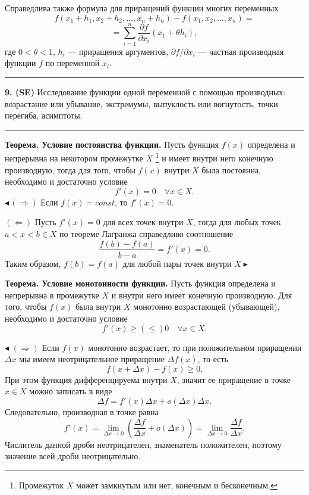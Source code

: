 \documentclass[12pt]{article}
\begin{document}
Справедлива также формула для приращений функции многих переменных
$$
f(x_1 + h_1, x_2 + h_2, ..., x_n + h_n) - f(x_1, x_2, ..., x_n) =
$$
$$
 = \sum_{i = 1}^n\frac{\partial f}{\partial x_i}(x_1 + \theta h_i),
$$
где $0 < \theta < 1$, $h_i$ --- приращения аргументов, $\partial f/ \partial x_i$ --- частная производная функции $f$ по переменной $x_i$.  \\

\noindent\rule{\textwidth}{1pt}
\textbf{9. (SE)} Исследование функции одной переменной с помощью производных: возрастание или убывание, экстремумы, выпуклость или вогнутость, точки перегиба, асимптоты.
	
\noindent\rule{\textwidth}{1pt}

\textbf{Теорема. Условие постоянства функции.} Пусть функция $f(x)$ определена и непрерывна на некотором промежутке $X$ \footnote{Промежуток $X$ может замкнутым или нет, конечным и бесконечным.} и имеет внутри него конечную производную, тогда для того, чтобы $f(x)$ внутри $X$ была постоянна, необходимо и достаточно условие
$$
	f'(x) = 0 \quad \forall x \in X.
$$
$\blacktriangleleft \, (\Rightarrow) $ Если $f(x) = const$, то $f'(x) = 0$.

$(\Leftarrow)$ Пусть $f'(x) = 0$ для всех точек внутри $X$, тогда для любых точек $a < x < b \in X$ по теореме Лагранжа справедливо соотношение
$$
\frac{f(b)-f(a)}{b-a} = f'(x) = 0.
$$
Таким образом, $f(b) = f(a)$ для любой пары точек внутри $X \blacktriangleright$


\textbf{Теорема. Условие монотонности функции.} Пусть функция определена и непрерывна в промежутке $X$ и внутри него имеет конечную производную. Для того, чтобы $f(x)$ была внутри $X$ монотонно возрастающей (убывающей), необходимо и достаточно условие
$$
f'(x) \geq(\leq) 0 \quad \forall x \in X.
$$


$\blacktriangleleft$ $(\Rightarrow)$ Если $f(x)$ монотонно возрастает, то при положительном приращении $\Delta x$ мы имеем неотрицательное приращение $\Delta f(x)$, то есть
$$
	f(x + \Delta x) - f(x) \geq 0.
$$
При этом функция дифференцируема внутри $X$, значит ее приращение в точке $x \in X$ можно записать в виде
$$
\Delta f = f'(x)\Delta x + o(\Delta x)\Delta x.
$$
Следовательно, производная в точке равна
$$
f'(x) = \lim_{\Delta x \rightarrow 0} \left( \frac{\Delta f}{\Delta x} + o(\Delta x) \right) = \lim_{\Delta x \rightarrow 0} \frac{\Delta f}{\Delta x}.
$$
Числитель данной дроби неотрицателен, знаменатель положителен, поэтому значение всей дроби неотрицательно.
\end{document}
